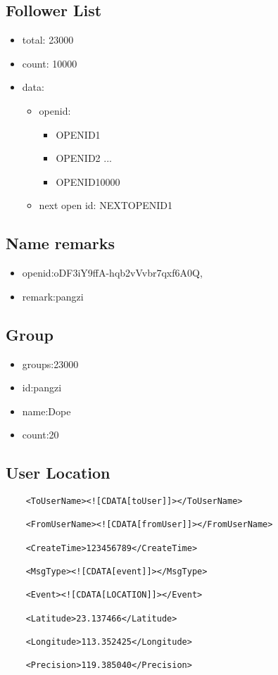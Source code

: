 \documentclass{article}
\begin{document}
\subsection{Follower List}
\begin{itemize}
	\item total: 23000
	\item count: 10000
	\item data:
    
    \begin{itemize}
    \item openid:
    \begin{itemize}
        \item OPENID1
       	\item OPENID2
        ...
        \item OPENID10000
     \end{itemize}
	\item  next open id: NEXTOPENID1
	\end{itemize}
\end{itemize}


\subsection{Name remarks}
\begin{itemize}
	\item openid:oDF3iY9ffA-hqb2vVvbr7qxf6A0Q,
	\item remark:pangzi
\end{itemize}

\subsection{Group}
\begin{itemize}
	\item groups:23000
	\item id:pangzi
	\item name:Dope
	\item count:20
\end{itemize}

\subsection{User Location}
	\begin{verbatim}
	<ToUserName><![CDATA[toUser]]></ToUserName>
	
	<FromUserName><![CDATA[fromUser]]></FromUserName>
	
	<CreateTime>123456789</CreateTime>
	
	<MsgType><![CDATA[event]]></MsgType>
	
	<Event><![CDATA[LOCATION]]></Event>
	
	<Latitude>23.137466</Latitude>
	
	<Longitude>113.352425</Longitude>
	
	<Precision>119.385040</Precision>
	\end{verbatim}
\end{document}
